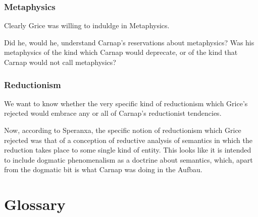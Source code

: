 \documentclass[10pt,titlepage]{book}
\begin{document}
\subsection{Metaphysics}

Clearly Grice was willing to induldge in Metaphysics.

Did he, would he, understand Carnap's reservations about metaphysics?
Was his metaphysics of the kind which Carnap would deprecate, or of the kind that Carnap would not call metaphysics?

\subsection{Reductionism}

We want to know whether the very specific kind of reductionism which Grice's rejected would embrace any or all of Carnap's reductionist tendencies.

Now, according to Speranxa, the specific notion of reductionism which Grice rejected was that of a conception of reductive analysis of semantics in which the reduction takes place to some single kind of entity.
This looks like it is intended to include dogmatic phenomenalism as a doctrine about semantics, which, apart from the dogmatic bit is what Carnap was doing in the Aufbau.

\chapter*{Glossary}\label{glossary}

\begin{description}
\item[]
\end{description}

\backmatter




\label{index}
\twocolumn[]
{\small\printindex}
\end{document}
